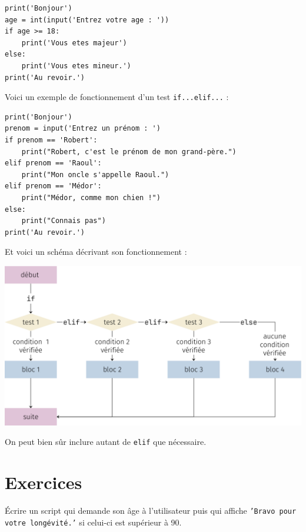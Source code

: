 \begin{pyc}
	\begin{verbatim}
print('Bonjour')
age = int(input('Entrez votre age : '))
if age >= 18:
    print('Vous etes majeur')
else:
    print('Vous etes mineur.')
print('Au revoir.')
\end{verbatim}
\end{pyc}

Voici un exemple de fonctionnement d'un test \texttt{if...elif...} :
\begin{pyc}
	\begin{verbatim}
print('Bonjour')
prenom = input('Entrez un prénom : ')
if prenom == 'Robert':
    print("Robert, c'est le prénom de mon grand-père.")
elif prenom == 'Raoul':
    print("Mon oncle s'appelle Raoul.")
elif prenom == 'Médor':
    print("Médor, comme mon chien !")
else:
    print("Connais pas")
print('Au revoir.')
\end{verbatim}
\end{pyc}
Et voici un schéma décrivant son fonctionnement :
\begin{center}
	\includegraphics[width=\linewidth]{ch-conditions/img/ifelifelse}
\end{center}



On peut bien sûr inclure autant de \texttt{elif} que nécessaire.

\section{Exercices}

\begin{exercice}
	\'Ecrire un script qui demande son âge à l'utilisateur puis qui affiche \texttt{'Bravo pour votre longévité.'} si celui-ci est supérieur à 90.
\end{exercice}

